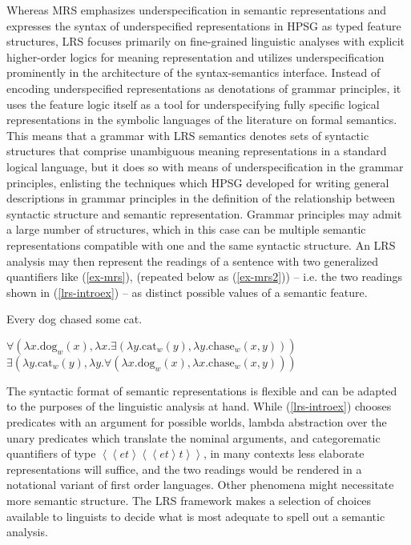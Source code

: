 \documentclass[output=paper]{langsci/langscibook}
\begin{document}
Whereas MRS emphasizes underspecification in semantic representations and expresses the syntax of underspecified representations in HPSG as typed feature structures, LRS focuses primarily on fine-grained linguistic analyses with explicit higher-order logics for meaning representation and utilizes underspecification prominently in the architecture of the syntax-semantics interface. Instead of encoding underspecified representations as denotations of grammar principles, it uses the feature logic itself as a tool for underspecifying fully specific logical representations in the symbolic languages of the literature on formal semantics. This means that a grammar with LRS semantics denotes sets of syntactic structures that comprise unambiguous meaning representations in a standard logical language, but it does so with means of underspecification in the grammar principles, enlisting the techniques which HPSG developed for writing general descriptions in grammar principles in the definition of the relationship between syntactic structure and semantic representation. Grammar principles may admit a large number of structures, which in this case can be multiple semantic representations compatible with one and the same syntactic structure. An LRS analysis may then represent the readings of a sentence with two generalized quantifiers like (\ref{ex-mrs}),  (repeated below as (\ref{ex-mrs2})) -- i.e. the two readings shown in (\ref{lrs-introex}) -- as distinct possible values of a semantic feature.


\begin{exe}
\ex\label{ex-mrs2}
Every dog chased some cat.
\end{exe}

\begin{exe}
  \ex\label{lrs-introex}
\begin{xlist}
  \ex\label{lrs-introex1a}
  
  $\forall \left(\lambda x.\text{dog}_w(x),\lambda x.\exists \left(\lambda y.\text{cat}_w(y),\lambda y.\text{chase}_w(x,y)\right)\right)$ 
  \ex\label{lrs-introex1b}
  $\exists \left(\lambda y.\text{cat}_w(y),\lambda y.\forall \left(\lambda x.\text{dog}_w(x),\lambda x.\text{chase}_w(x,y)\right)\right)$ 
\end{xlist}
\end{exe}


The syntactic format of semantic representations is flexible and can be adapted to the purposes of the linguistic analysis at hand. While (\ref{lrs-introex}) chooses predicates with an argument for possible worlds, lambda abstraction over the unary predicates which translate the nominal arguments, and categorematic quantifiers of type ${\left<\left<et\right>\left<\left<et\right>t\right>\right>}$, in many contexts less elaborate representations will suffice, and the two readings would be rendered in a notational variant of first order languages. Other phenomena might necessitate more semantic structure. The LRS framework makes a selection of choices available to linguists to decide what is most adequate to spell out a semantic analysis.
\end{document}
